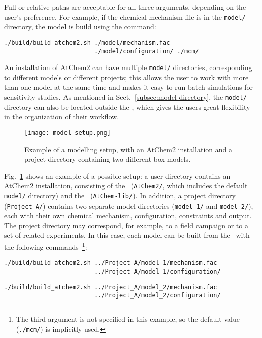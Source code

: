Full or relative paths are acceptable for all three arguments,
depending on the user's preference. For example, if the chemical
mechanism file is in the \texttt{model/} directory, the model is build
using the command:

\begin{verbatim}
./build/build_atchem2.sh ./model/mechanism.fac
                         ./model/configuration/ ./mcm/
\end{verbatim}

An installation of AtChem2 can have multiple \texttt{model/}
directories, corresponding to different models or different projects;
this allows the user to work with more than one model at the same time
and makes it easy to run batch simulations for sensitivity studies. As
mentioned in Sect.~\ref{subsec:model-directory}, the \texttt{model/}
directory can also be located outside the \maindir, which gives the
users great flexibility in the organization of their workflow.

\begin{figure}[htb]
  \centering
  \texttt{[image: model-setup.png]}
  \caption{Example of a modelling setup, with an AtChem2 installation
    and a project directory containing two different box-models.}
  \label{fig:setup}
\end{figure}

Fig.~\ref{fig:setup} shows an example of a possible setup: a user
directory contains an AtChem2 installation, consisting of the
\maindir\ (\texttt{AtChem2/}, which includes the default
\texttt{model/} directory) and the \depdir\ (\texttt{AtChem-lib/}). In
addition, a project directory (\texttt{Project\_A/}) contains two
separate model directories (\texttt{model\_1/} and
\texttt{model\_2/}), each with their own chemical mechanism,
configuration, constraints and output. The project directory may
correspond, for example, to a field campaign or to a set of related
experiments. In this case, each model can be built from the \maindir\
with the following commands~\footnote{The third argument is not
  specified in this example, so the default value (\texttt{./mcm/}) is
  implicitly used.}:

\begin{verbatim}
./build/build_atchem2.sh ../Project_A/model_1/mechanism.fac
                         ../Project_A/model_1/configuration/
\end{verbatim}

\begin{verbatim}
./build/build_atchem2.sh ../Project_A/model_2/mechanism.fac
                         ../Project_A/model_2/configuration/
\end{verbatim}

